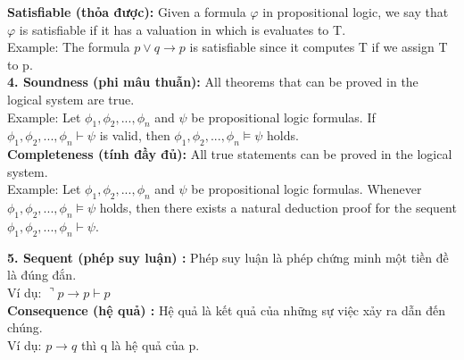 \documentclass[a4paper]{article}
\begin{document}
\textbf{{\large\hspace{1 cm} Satisfiable (thỏa được): }}
{\large Given a formula $\varphi$ in propositional logic, we say that $\varphi$ is satisfiable if it has a valuation in which is evaluates to T.\\
	
	\hspace{1.5 cm} Example: The formula $p \vee q \rightarrow p$ is satisfiable since it computes T if we
	assign T to p.}\\

\textbf{{\large\hspace{0.5 cm} 4. Soundness (phi mâu thuẫn): }}
{\large All theorems that can be proved in the logical system are true.\\
	
	\hspace{1.5 cm} Example: Let $\phi_{1},\phi_{2}, . . . , \phi_{n}$ and $\psi$ be propositional logic formulas. If $\phi_{1},\phi_{2}, . . . , \phi_{n} \vdash \psi$ is valid, then $\phi_{1},\phi_{2}, . . . , \phi_{n} \models \psi$ holds.}\\

\textbf{{\large\hspace{1 cm} Completeness (tính đầy đủ): }}
{\large All true statements can be proved in the logical system.\\
	
	\hspace{1.5 cm} Example: Let $\phi_{1},\phi_{2}, . . . , \phi_{n}$ and $\psi$ be propositional logic formulas. Whenever $\phi_{1},\phi_{2}, . . . , \phi_{n} \models \psi$ holds, then there exists a natural deduction proof for the sequent $\phi_{1},\phi_{2}, . . . , \phi_{n} \vdash \psi$.}

\textbf{{\large\hspace{0.5 cm} 5. Sequent (phép suy luận) : }}{\large Phép suy luận là phép chứng minh một tiền đề là đúng đắn.\\
	
	\hspace{1 cm} Ví dụ: $\urcorner p \rightarrow p \vdash p$}\\

\textbf{{\large\hspace{1 cm} Consequence (hệ quả) : }}
{\large Hệ quả là kết quả của những sự việc xảy ra dẫn đến chúng.\\
	
	\hspace{1 cm} Ví dụ: $p \rightarrow q$ thì q là hệ quả của p. }\\
\end{document}
